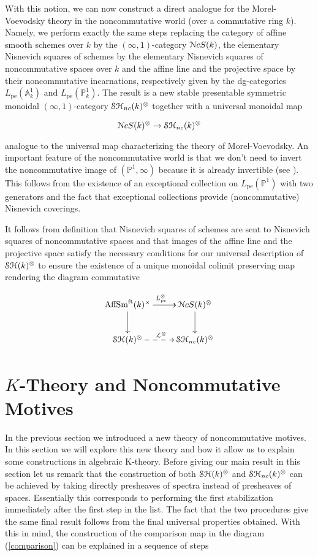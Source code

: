\begin{refsection}
With this notion, we can now construct a direct analogue for the Morel-Voevodsky theory in the noncommutative world (over a commutative ring $k$). Namely, we perform exactly the same steps replacing the category of affine smooth schemes over $k$ by the $(\infty,1)$-category $\mathcal{N}cS(k)$, the elementary Nisnevich squares of schemes by the elementary Nisnevich squares of noncommutative spaces over $k$ and the affine line and the projective space by their noncommutative incarnations, respectively given by the dg-categories $L_\mathrm{pe}(\mathbb{A}^1_k)$ and $L_\mathrm{pe}(\mathbb{P}^1_k)$. The result is a new stable presentable symmetric monoidal $(\infty,1)$-category $\mathcal{S}\mathcal{H}_{nc}(k)^{\otimes}$ together with a universal monoidal map 

$$\mathcal{N}cS(k)^{\otimes}\to \mathcal{S}\mathcal{H}_{nc}(k)^{\otimes}$$

\noindent analogue to the universal map characterizing the theory of Morel-Voevodsky. An important feature of the noncommutative world is that we don't need to invert the noncommutative image of $(\mathbb{P}^1,\infty)$ because it is already invertible  (see \cite[6.55]{nc1}). This follows from the existence of an exceptional collection on $L_\mathrm{pe}(\mathbb{P}^1)$ with two generators and the fact that exceptional collections provide (noncommutative) Nisnevich coverings.

It follows from definition that Nisnevich squares of schemes are sent to Nisnevich squares of noncommutative spaces and that images of the affine line and the projective space satisfy the necessary conditions for our universal description of $\mathcal{S}\mathcal{H}(k)^{\otimes}$ to ensure the existence of a unique monoidal colimit preserving map rendering the diagram commutative

\begin{equation}
\label{comparison}
\xymatrix{
\aff^{\times}\ar[r]^{L_\mathrm{pe}^{\otimes}}\ar[r]\ar[d]& \nck^{\otimes}\ar[d]\\
\stmonoidalk\ar@{-->}[r]^{\mathcal{L}^{\otimes}}&\stncmonoidalk
}
\end{equation}


\section{$K$-Theory and Noncommutative Motives}

In the previous section we introduced a new theory of noncommutative motives. In this section we will explore this new theory and how it allow us to explain some constructions in algebraic K-theory. Before giving our main result in this section let us remark that the construction of both $\mathcal{S}\mathcal{H}(k)^{\otimes}$ and $\mathcal{S}\mathcal{H}_{nc}(k)^{\otimes}$ can be achieved by taking directly presheaves of spectra instead of presheaves of spaces. Essentially this corresponds to performing the first stabilization immediately after the first step in the list. The fact that the two procedures give the same final result follows from the final universal properties obtained. With this in mind, the construction of the comparison map in the diagram (\ref{comparison}) can be explained in a sequence of steps



\end{refsection}
